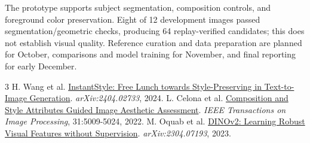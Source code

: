 \documentclass{article}
\begin{document}
The prototype supports subject segmentation, composition controls, and foreground color preservation. Eight of 12 development images passed segmentation/geometric checks, producing 64 replay-verified candidates; this does not establish visual quality. Reference curation and data preparation are planned for October, comparisons and model training for November, and final reporting for early December.

{\small
\begin{thebibliography}{3}
\setlength{\bibsep}{0pt}
H. Wang et al.
\href{https://arxiv.org/abs/2404.02733}{InstantStyle: Free Lunch towards Style-Preserving in Text-to-Image Generation}.
\emph{arXiv:2404.02733}, 2024.
L. Celona et al.
\href{https://arxiv.org/abs/2111.04647}{Composition and Style Attributes Guided Image Aesthetic Assessment}.
\emph{IEEE Transactions on Image Processing}, 31:5009-5024, 2022.
M. Oquab et al.
\href{https://arxiv.org/abs/2304.07193}{DINOv2: Learning Robust Visual Features without Supervision}.
\emph{arXiv:2304.07193}, 2023.
\end{thebibliography}
}
\end{document}
